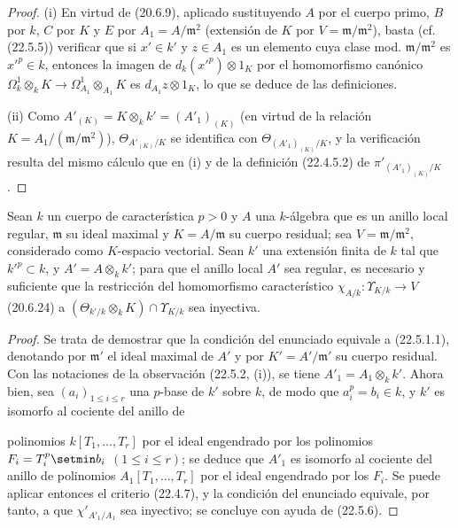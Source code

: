 \begin{proof}
(i) En virtud de (20.6.9), aplicado sustituyendo $A$ por el cuerpo primo, $B$
por $k$, $C$ por $K$ y $E$ por $A_1=A/\mathfrak m^2$ (extensión de $K$ por
$V=\mathfrak m/\mathfrak m^2$), basta (cf. (22.5.5)) verificar que si
$x'\in k'$ y $z\in A_1$ es un elemento cuya clase mod.
$\mathfrak m/\mathfrak m^2$ es $x'^p\in k$, entonces la imagen de
$d_k(x'^p)\otimes1_K$ por el homomorfismo canónico
$\Omega^1_k\otimes_kK\longrightarrow\Omega^1_{A_1}\otimes_{A_1}K$ es
$d_{A_1}z\otimes1_K$, lo que se deduce de las definiciones.

(ii) Como $A'_{(K)}=K\otimes_kk'=(A'_1)_{(K)}$ (en virtud de la relación
$K=A_1/(\mathfrak m/\mathfrak m^2)$), $\Theta_{A'_{(K)}/K}$ se identifica con
$\Theta_{(A'_1)_{(K)}/K}$, y la verificación resulta del mismo cálculo que en
(i) y de la definición (22.4.5.2) de $\pi'_{(A'_1)_{(K)}/K}$.
\end{proof}

\begin{proposition}[22.5.7]
\label{0.22.5.7-fr}
Sean $k$ un cuerpo de característica $p>0$ y $A$ una $k$-álgebra que es un
anillo local regular, $\mathfrak m$ su ideal maximal y $K=A/\mathfrak m$ su
cuerpo residual; sea $V=\mathfrak m/\mathfrak m^2$, considerado como
$K$-espacio vectorial. Sean $k'$ una extensión finita de $k$ tal que
$k'^p\subset k$, y $A'=A\otimes_kk'$; para que el anillo local $A'$ sea
regular, es necesario y suficiente que la restricción del homomorfismo
característico $\chi_{A/k}:\Upsilon_{K/k}\longrightarrow V$ \textup{(20.6.24)} a
$(\Theta_{k'/k}\otimes_kK)\cap\Upsilon_{K/k}$ sea inyectiva.
\end{proposition}

\begin{proof}
Se trata de demostrar que la condición del enunciado equivale a
(22.5.1.1), denotando por $\mathfrak m'$ el ideal maximal de $A'$ y por
$K'=A'/\mathfrak m'$ su cuerpo residual. Con las notaciones de la observación
(22.5.2, (i)), se tiene $A'_1=A_1\otimes_kk'$. Ahora bien, sea
$(a_i)_{1\leqslant i\leqslant r}$ una $p$-base de $k'$ sobre $k$, de modo que
$a_i^p=b_i\in k$, y $k'$ es isomorfo al cociente del anillo de


polinomios $k[T_1,\ldots,T_r]$ por el ideal engendrado por los polinomios
$F_i=T_i^p\setmin b_i$ $(1\leqslant i\leqslant r)$; se deduce que $A'_1$ es
isomorfo al cociente del anillo de polinomios $A_1[T_1,\ldots,T_r]$ por
el ideal engendrado por los $F_i$. Se puede aplicar entonces el criterio (22.4.7), y
la condición del enunciado equivale, por tanto, a que $\chi'_{A'_1/A_1}$ sea
inyectivo; se concluye con ayuda de (22.5.6).
\end{proof}

